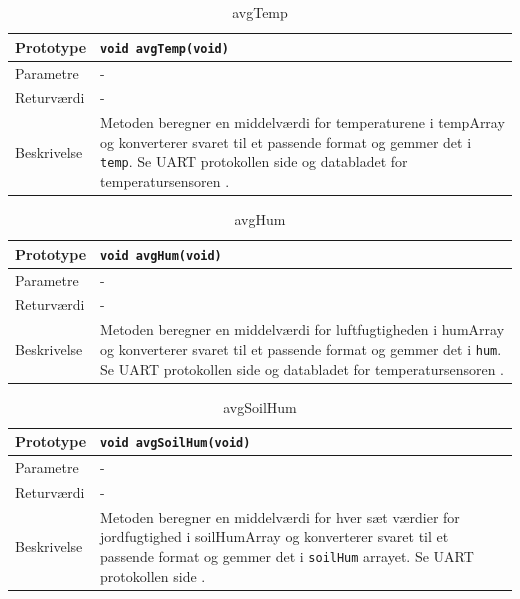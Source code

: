 
\begin{table}[h]
\begin{tabularx}{\textwidth}{| L{2.5 cm} | Z |} \hline
Prototype & \texttt{void avgTemp(void)} \\\hline
Parametre & - \\\hline
Returværdi & - \\\hline
Beskrivelse & Metoden beregner en middelværdi for temperaturene i tempArray og konverterer svaret til et passende format og gemmer det i \texttt{temp}. Se UART protokollen side \pageref{sec:UART_protokol} og databladet for temperatursensoren \cite{lib:TempHum_I2C}.  \\ \hline
\end{tabularx}
\caption{avgTemp}
\label{table:avgTemp}
\end{table}


\begin{table}[h]
\begin{tabularx}{\textwidth}{| L{2.5 cm} | Z |} \hline
Prototype & \texttt{void avgHum(void)} \\\hline
Parametre & - \\\hline
Returværdi & - \\\hline
Beskrivelse & Metoden beregner en middelværdi for luftfugtigheden i humArray og konverterer svaret til et passende format og gemmer det i \texttt{hum}. Se UART protokollen side \pageref{sec:UART_protokol} og databladet for temperatursensoren \cite{lib:TempHum_I2C}.  \\ \hline
\end{tabularx}
\caption{avgHum}
\label{table:avgHum}
\end{table}

\clearpage


\begin{table}[h]
\begin{tabularx}{\textwidth}{| L{2.5 cm} | Z |} \hline
Prototype & \texttt{void avgSoilHum(void)} \\\hline
Parametre & - \\\hline
Returværdi & - \\\hline
Beskrivelse & Metoden beregner en middelværdi for hver sæt værdier for jordfugtighed i soilHumArray og konverterer svaret til et passende format og gemmer det i \texttt{soilHum} arrayet. Se UART protokollen side \pageref{sec:UART_protokol}.  \\ \hline
\end{tabularx}
\caption{avgSoilHum}
\label{table:avgSoilHum}
\end{table}


